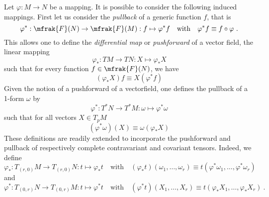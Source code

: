 \documentclass[10pt,reqno]{amsart}
\numberwithin{equation}{section}
\begin{document}
Let $\varphi : M \rightarrow N$ be a mapping. It is possible to 
consider the following induced mappings. First let us consider 
the \emph{pullback} of a generic function $f$, that is
%
\begin{equation}
	\varphi^\ast : \mfrak{F}(N) \to \mfrak{F}(M) : f \mapsto 
	\varphi^\ast f \quad \mathrm{with} \quad \varphi^\ast f \equiv 
	f \circ \varphi~.
\end{equation}
%
This allows one to define the \emph{differential map} or 
\emph{pushforward} of a vector field, the linear mapping 
%
\begin{equation}
	\varphi_\ast : TM \rightarrow TN : X \mapsto \varphi_\ast X
\end{equation}
such that for every function $f \in \mfrak{F}(N)$, we have
\begin{equation}
	(\varphi_\ast X) f \equiv X (\varphi^\ast f)
\end{equation}
%
Given the notion of a pushforward of a vectorfield, one defines 
the pullback of a 1-form $\omega$ by
\begin{equation}
	\varphi^\ast : T^\ast N \rightarrow T^\ast M : \omega \mapsto 
	\varphi^\ast \omega
\end{equation}
such that for all vectors $X \in T_p M$
\begin{equation}
	(\varphi^\ast \omega) (X) \equiv \omega (\varphi_\ast X)
\end{equation}
%
These definitions are readily extended to incorporate the 
pushforward and pullback of respectively complete contravariant 
and covariant tensors. Indeed, we define
%
\begin{equation}
	\varphi_\ast : T_{(r,0)}M \to T_{(r,0)}N : t \mapsto 
	\varphi_\ast t
	\quad \text{with} \quad
	(\varphi_\ast t)(\omega_1,\ldots,\omega_r) \equiv 
	t(\varphi^\ast\omega_1,\ldots,\varphi^\ast\omega_r)
\end{equation}
and
%
\begin{equation}
	\varphi^\ast : T_{(0,r)}N \to T_{(0,r)}M : t \mapsto 
	\varphi^\ast t
	\quad \text{with} \quad
	(\varphi^\ast t)(X_1,\ldots,X_r) \equiv t(\varphi_\ast 
	X_1,\ldots,\varphi_\ast X_r)~.
\end{equation}
\end{document}
